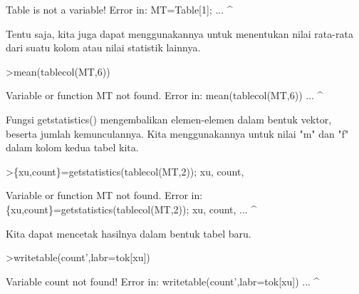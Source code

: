 \documentclass[12pt,arial,letterpaper]{book}
\begin{document}
\begin{eulercomment}
\begin{eulercomment}
\begin{eulercomment}
\begin{eulercomment}
\begin{eulercomment}
\begin{eulercomment}
\begin{eulercomment}
\begin{eulercomment}
\begin{eulercomment}
\begin{eulercomment}
\begin{eulercomment}
\begin{eulercomment}
\begin{eulercomment}
\begin{eulercomment}
\begin{eulercomment}
\begin{eulercomment}
\begin{eulercomment}
\begin{eulercomment}
\begin{eulercomment}
\begin{eulercomment}
\begin{eulercomment}
\begin{eulercomment}
\begin{eulercomment}
\begin{eulercomment}
\begin{eulercomment}
\begin{eulercomment}
\begin{eulercomment}
\begin{eulercomment}
\begin{eulercomment}
\begin{eulercomment}
\begin{eulercomment}
\begin{eulercomment}
\begin{euleroutput}
  Table is not a variable!
  Error in:
  MT=Table[1]; ...
             ^
\end{euleroutput}
\begin{eulercomment}
Tentu saja, kita juga dapat menggunakannya untuk menentukan nilai
rata-rata dari suatu kolom atau nilai statistik lainnya.
\end{eulercomment}
\begin{eulerprompt}
>mean(tablecol(MT,6))
\end{eulerprompt}
\begin{euleroutput}
  Variable or function MT not found.
  Error in:
  mean(tablecol(MT,6)) ...
                  ^
\end{euleroutput}
\begin{eulercomment}
Fungsi getstatistics() mengembalikan elemen-elemen dalam bentuk
vektor, beserta jumlah kemunculannya. Kita menggunakannya untuk nilai
"m" dan "f" dalam kolom kedua tabel kita.
\end{eulercomment}
\begin{eulerprompt}
>\{xu,count\}=getstatistics(tablecol(MT,2)); xu, count,
\end{eulerprompt}
\begin{euleroutput}
  Variable or function MT not found.
  Error in:
  \{xu,count\}=getstatistics(tablecol(MT,2)); xu, count, ...
                                      ^
\end{euleroutput}
\begin{eulercomment}
Kita dapat mencetak hasilnya dalam bentuk tabel baru.
\end{eulercomment}
\begin{eulerprompt}
>writetable(count',labr=tok[xu])
\end{eulerprompt}
\begin{euleroutput}
  Variable count not found!
  Error in:
  writetable(count',labr=tok[xu]) ...
                   ^
\end{euleroutput}

\end{eulercomment}
\end{eulercomment}
\end{eulercomment}
\end{eulercomment}
\end{eulercomment}
\end{eulercomment}
\end{eulercomment}
\end{eulercomment}
\end{eulercomment}
\end{eulercomment}
\end{eulercomment}
\end{eulercomment}
\end{eulercomment}
\end{eulercomment}
\end{eulercomment}
\end{eulercomment}
\end{eulercomment}
\end{eulercomment}
\end{eulercomment}
\end{eulercomment}
\end{eulercomment}
\end{eulercomment}
\end{eulercomment}
\end{eulercomment}
\end{eulercomment}
\end{eulercomment}
\end{eulercomment}
\end{eulercomment}
\end{eulercomment}
\end{eulercomment}
\end{eulercomment}
\end{eulercomment}
\end{document}
